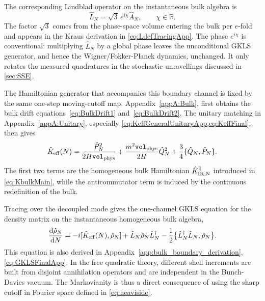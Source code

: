 \documentclass{article}
\newcommand{\Vphys}{\mathtt{vol}_{\rm phys}}
\numberwithin{equation}{section}
\begin{document}
	The corresponding Lindblad operator on the instantaneous bulk algebra is
	\begin{equation}\label{eq:Lsqrt3A}
		\hat L_N = \sqrt3\,e^{i\chi}\hat A_N, \qquad \chi\in\mathbb R .
	\end{equation}
	The factor \(\sqrt3\) comes from the phase-space volume entering the bulk per $e$-fold and appears in the Kraus derivation in \cref{eq:LdefTracingApp}. The phase \(e^{i\chi}\) is conventional: multiplying \(\hat L_N\) by a global phase leaves the unconditional GKLS generator, and hence the Wigner/Fokker-Planck dynamics, unchanged. It only rotates the measured quadratures in the stochastic unravellings discussed in \cref{sec:SSE}.

	The Hamiltonian generator that accompanies this boundary channel is fixed by the same one-step moving-cutoff map. Appendix~\ref{appA:Bulk}, first obtains the bulk drift equations~\eqref{eq:BulkDrift1} and~\eqref{eq:BulkDrift2}. The unitary matching in Appendix~\ref{appA:Unitary}, especially \cref{eq:KeffGeneralUnitaryApp,eq:KeffFinal}, then gives
	\begin{equation}\label{eq:Keff}
		\hat K_{\rm eff}(N) = \frac{\hat P_N^2}{2H\Vphys} + \frac{m^2\Vphys}{2H}\hat Q_N^2 + \frac34\{\hat Q_N,\hat P_N\}.
	\end{equation}
	The first two terms are the homogeneous bulk Hamiltonian  \(\hat K_{\rm IR, N}^{\parallel}\) introduced in \cref{eq:KbulkMain}, while the anticommutator term is induced by the continuous redefinition of the bulk.

	Tracing over the decoupled mode gives the one-channel GKLS equation for the density matrix on the instantaneous homogeneous bulk algebra,
	\begin{equation}\label{eq:Master1DN}
		\frac{\dd \hat\rho_N}{\dd N} = -i[\hat K_{\rm eff}(N),\hat\rho_N] + \hat L_N\hat\rho_N\hat L_N^\dagger - \frac12 \bigl\{ \hat L_N^\dagger\hat L_N,\hat\rho_N \bigr\}.
	\end{equation}
	This equation is also derived in Appendix~\ref{app:bulk_boundary_derivation}, \cref{eq:GKLSFinalApp}. In the free quadratic theory, different shell increments are built from disjoint annihilation operators and are independent in the Bunch-Davies vacuum. The Markovianity is thus a direct consequence of using the sharp cutoff in Fourier space defined in \cref{eq:heaviside}. 
\end{document}
